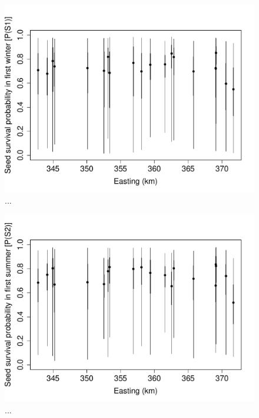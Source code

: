 \documentclass[12pt, oneside, titlepage]{article}   	%
\begin{document}
\iffalse

 \begin{figure}[h]
   \centering
       \includegraphics[page=1,width=1\textwidth]{../figures/spatial-s1.pdf}  
    \caption{ ... }
 \label{fig:test}
\end{figure}

 \begin{figure}[h]
   \centering
       \includegraphics[page=1,width=1\textwidth]{../figures/spatial-s2.pdf}  
    \caption{ ... }
 \label{fig:test}
\end{figure}
\end{document}
